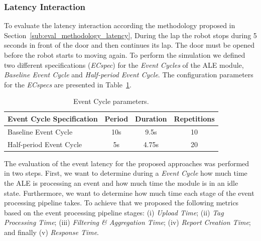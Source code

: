 \subsubsection{Latency Interaction}
\label{subs:eval_exp_latency}
To evaluate the latency interaction according the methodology proposed in Section~\ref{sub:eval_methodology_latency},
During the lap the robot stops during 5 seconds in front of the door and then continues its lap.
The door must be opened before the robot starts to moving again. To perform the simulation we defined
two different specifications (\textit{ECspec}) for the \textit{Event Cycles} of the \gls{ALE} module,
\textit{Baseline Event Cycle} and \textit{Half-period Event Cycle}. The configuration parameters
for the \textit{ECspecs} are presented in Table~\ref{table:ecspec_parameters}.

\begin{table}[ht!]
 \begin{tabular}{|l|c|c|c|}
  \hline
  Event Cycle Specification & Period  & Duration & Repetitions \\ \hline
  Baseline Event Cycle      &  10s    & 9.5s     & 10          \\ \hline
  Half-period Event Cycle   &   5s    & 4.75s    & 20          \\ \hline
 \end{tabular}
 \caption[Event Cycle parameters.]{Event Cycle parameters.}
 \label{table:ecspec_parameters}
\end{table}

The evaluation of the event latency for the proposed approaches was performed in two steps. First,
we want to determine during a \textit{Event Cycle} how much time the \gls{ALE} is processing an event
and how much time the module is in an idle state. Furthermore, we want to determine how much time
each stage of the event processing pipeline takes. To achieve that we proposed the following metrics
based on the event processing pipeline stages: (i) \textit{Upload Time}; (ii) \textit{Tag Processing Time};
(iii) \textit{Filtering \& Aggregation Time}; (iv) \textit{Report Creation Time}; and finally (v)
\textit{Response Time}.\\

